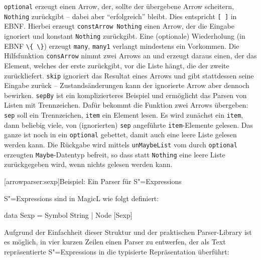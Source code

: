 \documentclass[12pt, a4paper, bibgerm]{scrbook}
\newenvironment{DIFnomarkup}{}{}
\newcommand\icode[1]{\lstinline?#1?}
\newcommand\lsection{}
\newcommand{\sexps}{S"=Expressions}
\begin{document}
\icode{optional} erzeugt einen Arrow, der, sollte der übergebene Arrow
scheitern, \icode{Nothing} zurückgibt -- dabei aber "`erfolgreich"'
bleibt. Dies entspricht \icode{[ ]} in EBNF. Hierbei erzeugt
\icode{constArrow Nothing} einen Arrow, der die Eingabe ignoriert und
konstant \icode{Nothing} zurückgibt. Eine (optionale) Wiederholung (in EBNF
\icode{\{ \}}) erzeugt \icode{many}, \icode{many1} verlangt mindestens
ein Vorkommen. Die Hilfsfunktion \icode{consArrow} nimmt zwei
Arrows an und erzeugt daraus einen, der das Element, welches der erste
zurückgibt, vor die Liste hängt, die der zweite zurückliefert.
\icode{skip} ignoriert das Resultat eines Arrows und gibt
stattdessen seine Eingabe zurück -- Zustandsänderungen kann der
ignorierte Arrow aber dennoch bewirken. \icode{sepBy} ist ein
komplizierteres Beispiel und ermöglicht das Parsen von Listen mit
Trennzeichen. Dafür bekommt die Funktion zwei Arrows übergeben:
\icode{sep} soll ein Trennzeichen, \icode{item} ein Element lesen. Es
wird zunächst ein \icode{item}, dann beliebig viele, von (ignorierten)
\icode{sep} angeführte \icode{item}-Elemente gelesen. Das ganze ist noch
in ein \icode{optional} gebettet, damit auch eine leere Liste gelesen
werden kann. Die Rückgabe wird mittels \icode{unMaybeList} vom durch
\icode{optional} erzeugten \icode{Maybe}-Datentyp befreit, so dass statt
\icode{Nothing} eine leere Liste zurückgegeben wird, wenn nichts gelesen
werden kann.

\lsection[arrowparser:sexp]{Beispiel: Ein Parser für \sexps{}}

\sexps{} sind in MagicL wie folgt definiert:
\begin{DIFnomarkup}\begin{code}
data Sexp = Symbol String
          | Node [Sexp]
\end{code}\end{DIFnomarkup}

Aufgrund der Einfachheit dieser Struktur und der praktischen
Parser-Library ist es möglich, in vier kurzen Zeilen einen Parser zu
entwerfen, der als Text repräsentierte \sexps{} in die typisierte
Repräsentation überführt:
\end{document}
